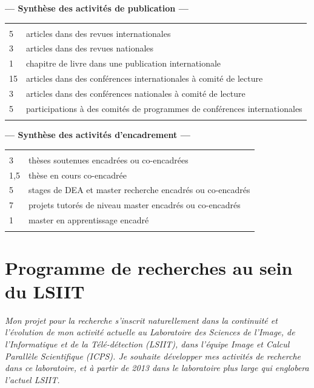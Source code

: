 \documentclass[11pt]{article}
\begin{document}
\begin{center}
	\textbf{--- Synthèse des activités de publication ---}\\[1mm]
\begin{tabular}{ll}
	\hline\\[-2mm]
	5	&	articles dans des revues internationales\\
	3	&	articles dans des revues nationales\\
	1	&	chapitre de livre dans une publication internationale\\
	15	& 	articles dans des conférences internationales à comité de lecture\\
	3	&	articles dans des conférences nationales à comité de lecture\\
	5	& 	participations à des comités de programmes de conférences internationales\\
	\hline\\
\end{tabular}


	\textbf{--- Synthèse des activités d'encadrement ---}\\[1mm]
\begin{tabular}{ll}
	\hline\\[-2mm]
	3	&	thèses soutenues encadrées ou co-encadrées\\
	1,5	& 	thèse en cours co-encadrée\\
	5	&	stages de DEA et master recherche encadrés ou co-encadrés\\
	7	& 	projets tutorés de niveau master encadrés ou co-encadrés\\
	1	& 	master en apprentissage encadré\\
	\hline\\
\end{tabular}

\end{center}


\section{Programme de recherches au sein du LSIIT}

\textit{%
Mon projet pour la recherche s'inscrit naturellement dans la continuité et 
l'évolution de mon activité actuelle au Laboratoire des Sciences de l'Image,
de l'Informatique et de la Télé-détection (LSIIT), dans l'équipe Image et
Calcul Parallèle Scientifique (ICPS). Je souhaite développer mes activités 
de recherche dans ce laboratoire, et à partir de  2013 dans le laboratoire 
plus large qui englobera l'actuel LSIIT.}\\
\end{document}
